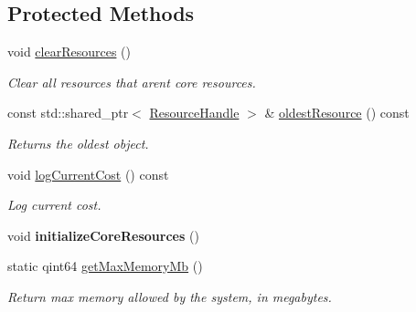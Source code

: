 \subsection*{Protected Methods}
\begin{DoxyCompactItemize}
\item 
\mbox{\label{classrev_1_1_resource_cache_a88856e828fa242e2bfba334a2a42c955}} 
void \mbox{\hyperlink{classrev_1_1_resource_cache_a88856e828fa242e2bfba334a2a42c955}{clear\+Resources}} ()
\begin{DoxyCompactList}\small\item\em Clear all resources that aren\textquotesingle{}t core resources. \end{DoxyCompactList}\item 
\mbox{\label{classrev_1_1_resource_cache_ac7214358b8395f6c856351158b457342}} 
const std\+::shared\+\_\+ptr$<$ \mbox{\hyperlink{classrev_1_1_resource_handle}{Resource\+Handle}} $>$ \& \mbox{\hyperlink{classrev_1_1_resource_cache_ac7214358b8395f6c856351158b457342}{oldest\+Resource}} () const
\begin{DoxyCompactList}\small\item\em Returns the oldest object. \end{DoxyCompactList}\item 
\mbox{\label{classrev_1_1_resource_cache_a35fa0940582ba813d28d33eab88bed87}} 
void \mbox{\hyperlink{classrev_1_1_resource_cache_a35fa0940582ba813d28d33eab88bed87}{log\+Current\+Cost}} () const
\begin{DoxyCompactList}\small\item\em Log current cost. \end{DoxyCompactList}\item 
\mbox{\label{classrev_1_1_resource_cache_ae3fd0138866cfe03e5e5a3558fbc0b19}} 
void {\bfseries initialize\+Core\+Resources} ()
\item 
\mbox{\label{classrev_1_1_resource_cache_ae9a6f6ba47fd8ab42dfe1e4522a94029}} 
static qint64 \mbox{\hyperlink{classrev_1_1_resource_cache_ae9a6f6ba47fd8ab42dfe1e4522a94029}{get\+Max\+Memory\+Mb}} ()
\begin{DoxyCompactList}\small\item\em Return max memory allowed by the system, in megabytes. \end{DoxyCompactList}\end{DoxyCompactItemize}
